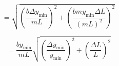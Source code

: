 \documentclass[12pt,a4paper]{article}
\begin{document}
\begin{enumerate}
\begin{equation*}
    = \sqrt{\left(\frac{b \Delta y_{\text{min}}}{mL}\right)^{2} + \left(\frac{bmy_{\text{min}}\Delta L}{(mL)^2}\right)^{2}}
\end{equation*}

\begin{equation*}
    = \frac{by_{\text{min}}}{mL} \sqrt{\left(\frac{\Delta y_{\text{min}}}{y_{\text{min}}}\right)^{2} + \left(\frac{\Delta L }{L}\right)^{2}}
\end{equation*}

    
\end{enumerate}
\end{document}

